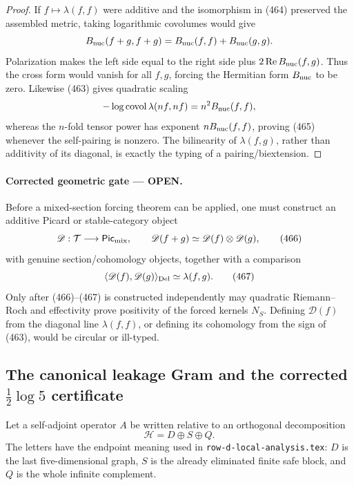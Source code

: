 \documentclass[11pt]{article}
\newcommand{\OPEN}{\textcolor{red!70!black}{\textbf{OPEN}}}
\begin{document}
\begin{proof}
If \(f\mapsto\lambda(f,f)\) were additive and the isomorphism in (464)
preserved the assembled metric, taking logarithmic covolumes would give
\[
 B_{\rm nuc}(f+g,f+g)
 =B_{\rm nuc}(f,f)+B_{\rm nuc}(g,g).
\]
Polarization makes the left side equal to the right side plus
\(2\operatorname{Re}B_{\rm nuc}(f,g)\).  Thus the cross form would vanish
for all \(f,g\), forcing the Hermitian form \(B_{\rm nuc}\) to be zero.
Likewise (463) gives quadratic scaling
\[
 -\log\operatorname{covol}\lambda(nf,nf)
 =n^2B_{\rm nuc}(f,f),
\]
whereas the \(n\)-fold tensor power has exponent
\(nB_{\rm nuc}(f,f)\), proving (465) whenever the self-pairing is nonzero.
The bilinearity of \(\lambda(f,g)\), rather than additivity of its diagonal,
is exactly the typing of a pairing/biextension.
\end{proof}

\paragraph{Corrected geometric gate --- \OPEN.}
Before a mixed-section forcing theorem can be applied, one must construct an
additive Picard or stable-category object
\[
 \mathscr D:\mathcal T\longrightarrow\mathsf{Pic}_{\rm mix},
 \qquad
 \mathscr D(f+g)\simeq\mathscr D(f)\otimes\mathscr D(g),          \tag{466}
\]
with genuine section/cohomology objects, together with a comparison
\[
 \langle\mathscr D(f),\mathscr D(g)\rangle_{\rm Del}
 \simeq\lambda(f,g).                                  \tag{467}
\]
Only after (466)--(467) is constructed independently may quadratic
Riemann--Roch and effectivity prove positivity of the forced kernels
\(N_S\).  Defining \(\mathscr D(f)\) from the diagonal line
\(\lambda(f,f)\), or defining its cohomology from the sign of (463), would
be circular or ill-typed.

\subsection{The canonical leakage Gram and the corrected \(\frac12\log5\)
certificate}

Let a self-adjoint operator \(A\) be written relative to an orthogonal
decomposition
\[
 \mathcal H=D\oplus S\oplus Q.
\]
The letters have the endpoint meaning used in
\texttt{row-d-local-analysis.tex}: \(D\) is the last five-dimensional
graph, \(S\) is the already eliminated finite safe block, and \(Q\) is the
whole infinite complement.
\end{document}
